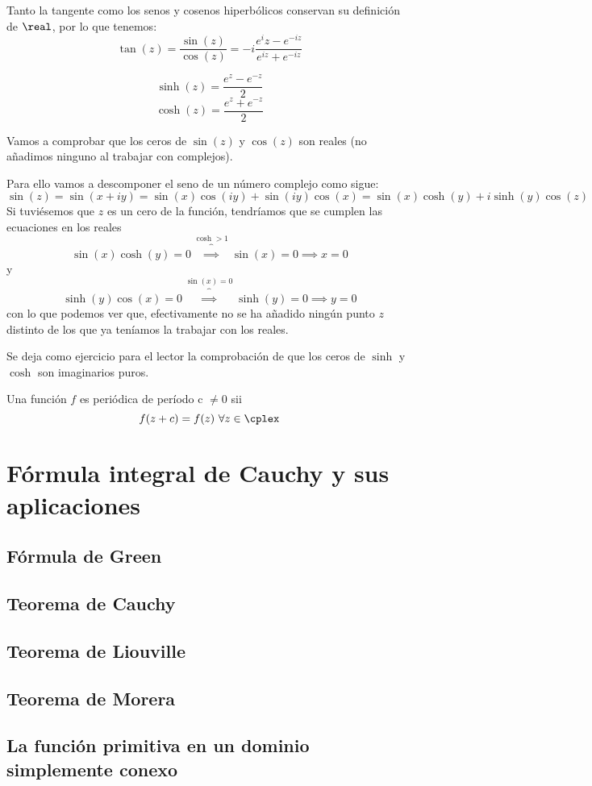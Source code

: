 \documentclass{apuntes}
\begin{document}
Tanto la tangente como los senos y cosenos hiperbólicos conservan su definición de $\real$, por lo que tenemos:
\[\tan(z)=\frac{\sin(z)}{\cos(z)}=-i \frac{e^iz-e^{-iz}}{e^{iz}+e^{-iz}}\]

\[\sinh(z)=\frac{e^z-e^{-z}}{2}\]
\[\cosh(z)=\frac{e^z+e^{-z}}{2}\]

\begin{example}
Vamos a comprobar que los ceros de $\sin(z)$ y $\cos(z)$ son reales (no añadimos ninguno al trabajar con complejos).

Para ello vamos a descomponer el seno de un número complejo como sigue:
\[\sin(z)=\sin(x+iy)=\sin(x)\cos(iy)+\sin(iy)\cos(x)=\sin(x)\cosh(y)+i\sinh(y)\cos(z)\]
Si tuviésemos que $z$ es un cero de la función, tendríamos que se cumplen las ecuaciones en los reales
\[\sin(x)\cosh(y)=0 \overbrace{\implies}^{\cosh > 1} \sin(x)=0 \implies x = 0\]
y
\[\sinh(y)\cos(x)=0 \overbrace{\implies}^{\sin(x)=0} \sinh(y)=0 \implies y=0\]
con lo que podemos ver que, efectivamente no se ha añadido ningún punto $z$ distinto de los que ya teníamos la trabajar con los reales.
\end{example}

Se deja como ejercicio para el lector la comprobación de que los ceros de $\sinh$ y $\cosh$ son imaginarios puros.

\begin{defn}
Una función $f$ es periódica de período c $\neq 0$ sii
\[f(z+c)=f(z) \ \forall z \in \cplex\]
\end{defn}

\chapter{Fórmula integral de Cauchy y sus aplicaciones}
\section{Fórmula de Green}
\section{Teorema de Cauchy}
\section{Teorema de Liouville}
\section{Teorema de Morera}
\section{La función primitiva en un dominio simplemente conexo}
\end{document}
